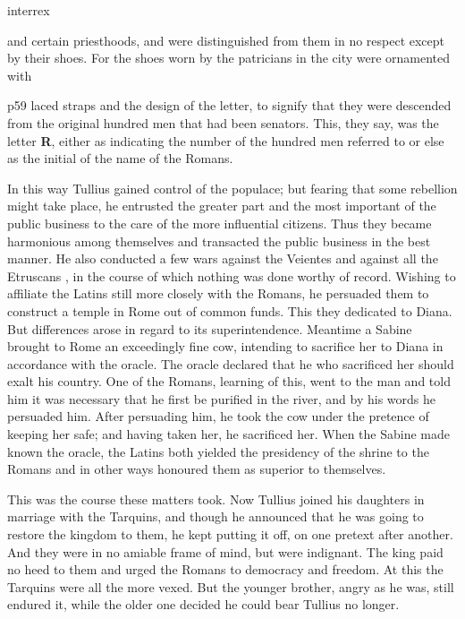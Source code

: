 interrex

and certain priesthoods, and were distinguished from them in no respect except by their shoes. For the shoes worn by the patricians in the city were ornamented with

p59 laced straps and the design of the letter, to signify that they were descended from the original hundred men that had been senators. This, they say, was the letter \textbf{R}, either as indicating the number of the hundred men referred to or else as the initial of the name of the Romans.

In this way Tullius gained control of the populace; but fearing that some rebellion might take place, he entrusted the greater part and the most important of the public business to the care of the more influential citizens. Thus they became harmonious among themselves and transacted the public business in the best manner. He also conducted a few wars against the Veientes and against all the Etruscans , in the course of which nothing was done worthy of record. Wishing to affiliate the Latins still more closely with the Romans, he persuaded them to construct a temple in Rome out of common funds. This they dedicated to Diana. But differences arose in regard to its superintendence. Meantime a Sabine brought to Rome an exceedingly fine cow, intending to sacrifice her to Diana in accordance with the oracle. The oracle declared that he who sacrificed her should exalt his country. One of the Romans, learning of this, went to the man and told him it was necessary that he first be purified in the river, and by his words he persuaded him. After persuading him, he took the cow under the pretence of keeping her safe; and having taken her, he sacrificed her. When the Sabine made known the oracle, the Latins both yielded the presidency of the shrine to the Romans and in other ways honoured them as superior to themselves.

This was the course these matters took. Now Tullius joined his daughters in marriage with the Tarquins, and though he announced that he was going to restore the kingdom to them, he kept putting it off, on one pretext after another. And they were in no amiable frame of mind, but were indignant. The king paid no heed to them and urged the Romans to democracy and freedom. At this the Tarquins were all the more vexed. But the younger brother, angry as he was, still endured it, while the older one decided he could bear Tullius no longer.

